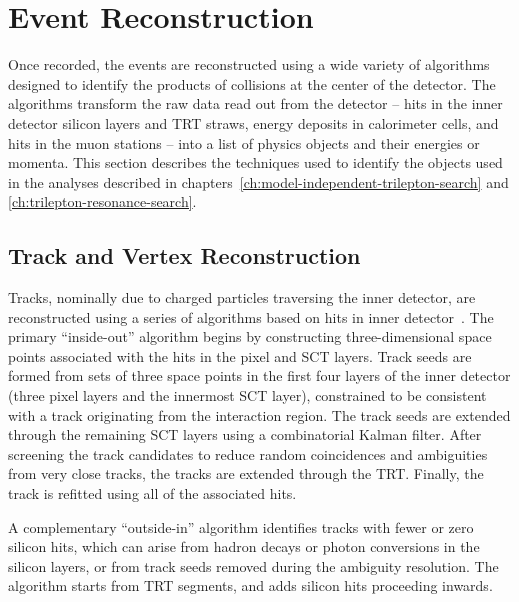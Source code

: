 \chapter{Event Reconstruction}\label{ch:event-reconstruction}

Once recorded, the events are reconstructed using a wide variety of algorithms designed to identify the products of collisions at the center of the detector. The algorithms transform the raw data read out from the detector -- hits in the inner detector silicon layers and TRT straws, energy deposits in calorimeter cells, and hits in the muon stations -- into a list of physics objects and their energies or momenta. This section describes the techniques used to identify the objects used in the analyses described in chapters~\ref{ch:model-independent-trilepton-search} and \ref{ch:trilepton-resonance-search}. 

\section{Track and Vertex Reconstruction}\label{sec:event-reconstruction-track-vertex}
Tracks, nominally due to charged particles traversing the inner detector, are reconstructed using a series of algorithms based on hits in inner detector~\cite{Cornelissen:2007vba,TheATLASCollaboration:2010vw,TheATLASCollaboration:2012tja}.
The primary ``inside-out'' algorithm begins by constructing three-dimensional space points associated with the hits in the pixel and SCT layers. Track seeds are formed from sets of three space points in the first four layers of the inner detector (three pixel layers and the innermost SCT layer), constrained to be consistent with a track originating from the interaction region. The track seeds are extended through the remaining SCT layers using a combinatorial Kalman filter. After screening the track candidates to reduce random coincidences and ambiguities from very close tracks, the tracks are extended through the TRT. Finally, the track is refitted using all of the associated hits. 

A complementary ``outside-in'' algorithm identifies tracks with fewer or zero silicon hits, which can arise from hadron decays or photon conversions in the silicon layers, or from track seeds removed during the ambiguity resolution. The algorithm starts from TRT segments, and adds silicon hits proceeding inwards. 

